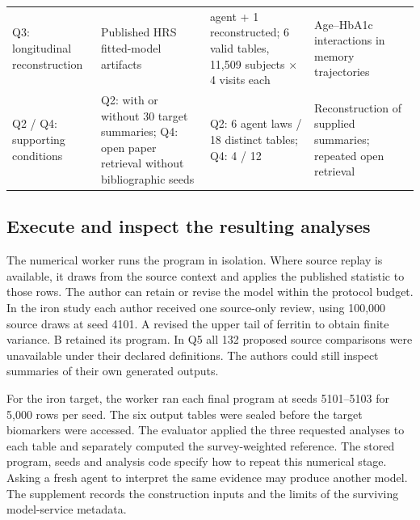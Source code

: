 \documentclass[sigconf,review]{acmart}
\begin{document}
\begin{table}[tp]
\begin{tabularx}{\textwidth}{@{}>{\raggedright\arraybackslash}X>{\raggedright\arraybackslash}X>{\raggedright\arraybackslash}X>{\raggedright\arraybackslash}X@{}}
Q3: longitudinal reconstruction & Published HRS fitted-model artifacts & 1 agent + 1 reconstructed; 6 valid tables, 11,509 subjects × 4 visits each & Age–\allowbreak{}HbA1c interactions in memory trajectories \\

Q2 / Q4: supporting conditions & Q2: with or without 30 target summaries; Q4: open paper retrieval without bibliographic seeds & Q2: 6 agent laws / 18 distinct tables; Q4: 4 / 12 & Reconstruction of supplied summaries; repeated open retrieval \\

\bottomrule

\end{tabularx}

\end{table}

\subsection{Execute and inspect the resulting analyses}

The numerical worker runs the program in isolation. Where source replay is available, it draws from the source context and applies the published statistic to those rows. The author can retain or revise the model within the protocol budget. In the iron study each author received one source-only review, using 100,000 source draws at seed 4101. A revised the upper tail of ferritin to obtain finite variance. B retained its program. In Q5 all 132 proposed source comparisons were unavailable under their declared definitions. The authors could still inspect summaries of their own generated outputs.


For the iron target, the worker ran each final program at seeds 5101–\allowbreak{}5103 for 5,000 rows per seed. The six output tables were sealed before the target biomarkers were accessed. The evaluator applied the three requested analyses to each table and separately computed the survey-weighted reference. The stored program, seeds and analysis code specify how to repeat this numerical stage. Asking a fresh agent to interpret the same evidence may produce another model. The supplement records the construction inputs and the limits of the surviving model-service metadata.
\end{document}
